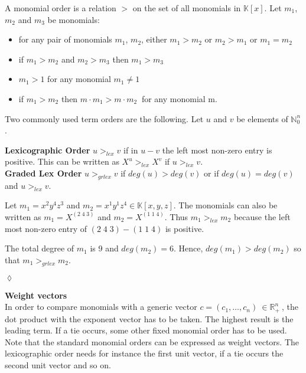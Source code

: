 \begin{env_definition} 
\cite{saleemi}
A monomial order is a relation $>$ on the set of all monomials in $\mathbb{K}\left[x\right]$.
Let $m_{1}$, $m_{2}$ and $m_{3}$ be monomials:
\begin{center}

\begin{itemize}

\item
for any pair of monomials $m_{1}$, $m_{2}$, either $m_{1} > m_{2}$ or $m_{2} > m_{1}$ or $m_{1} = m_{2}$ 
\item
if $m_{1} > m_{2} $ and $m_{2} > m_{3}$ then $m_{1} > m_{3}$
\item
$m_{1} > 1$ for any monomial $m_{1} \neq 1$
\item
if $m_{1} > m_{2}$ then $m \cdot m_{1} > m \cdot m_{2}~$ for any monomial m.

\end{itemize}
 
\end{center}

\end{env_definition}


Two commonly used term orders are the following.
Let $u$ and $v$ be elements of $\mathbb{N}^{n}_{0}$. 

\textbf{Lexicographic Order} \cite{saleemi}
$u >_{lex} v $ if in $u-v$ the left most non-zero entry is positive.
This can be written as $X^{u} >_{lex} X^{v}$ if $u >_{lex} v $.\\


\textbf{Graded Lex Order} \cite{saleemi}
$u >_{grlex} v $ if $ deg(u)>deg(v)$ or if $ deg(u)=deg(v)$ and $u >_{lex} v$.

\newpage
\begin{env_example} \normalfont
Let $m_{1} = x^{2}y^{4}z^{3}$ and $m_{2}= x^{1}y^{1}z^{4} \in \mathbb{K}\left[ x,y,z\right]  $.
The monomials can also be written as $m_{1} = X^{(2 \; 4 \; 3)}$ and $m_{2} = X^{(1 \; 1 \; 4)}$.
Thus $m_{1}>_{lex} m_{2}$ because the left most non-zero entry of $ (2 \; 4 \; 3) - (1 \; 1 \; 4)$ is positive.

The total degree of $m_{1}$ is 9 and $deg(m_{2})=6$. Hence, $deg(m_{1})>deg(m_{2})$ so that $m_{1}>_{grlex} m_{2}$. 
\begin{flushright}
$\lozenge$
\end{flushright}
\end{env_example}
  

\textbf{Weight vectors} \\
In order to compare monomials with a generic vector $c = \left({c}_{1},\dots ,{c}_{n}\right)~\in \mathbb{R}^{n}_{+}~$, the dot product with the exponent vector has to be taken. The highest result is the leading term. If a tie occurs, some other fixed monomial order has to be used. Note that the standard monomial orders can be expressed as weight vectors. The lexicographic order needs for instance the first unit vector, if a tie occurs the second unit vector and so on.

